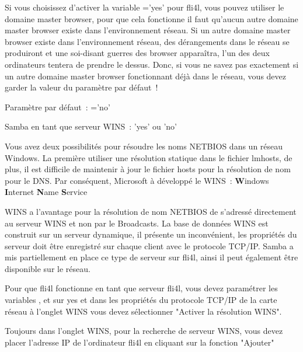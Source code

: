 \begin{description}

    Si vous choisissez d'activer la variable ='yes'
    pour fli4l, vous pouvez utiliser le domaine master browser, pour que cela
    fonctionne il faut qu'aucun autre domaine master browser existe dans
    l'environnement réseau. Si un autre domaine master browser existe dans
    l'environnement réseau, des dérangements dans le réseau se produiront et
    une soi-disant guerres des browser apparaîtra, l'un des deux ordinateurs
    tentera de prendre le dessus. Donc, si vous ne savez pas exactement si un
    autre domaine master browser fonctionnant déjà dans le réseau, vous devez
    garder la valeur du paramètre par défaut~!

    Paramètre par défaut~: ='no'



    Samba en tant que serveur WINS~: 'yes' ou 'no'

    Vous avez deux possibilités pour résoudre les noms NETBIOS dans un réseau
    Windows. La première utiliser une résolution statique dans le fichier lmhosts,
    de plus, il est difficile de maintenir à jour le fichier hosts pour la
    résolution de nom pour le DNS. Par conséquent, Microsoft à développé le WINS~:
    \textbf{W}indows \textbf{I}nternet \textbf{N}ame \textbf{S}ervice

    WINS a l'avantage pour la résolution de nom NETBIOS de s'adressé directement
    au serveur WINS et non par le Broadcasts. La base de données WINS est construit
    sur un serveur dynamique, il présente un inconvénient, les propriétés du
    serveur doit être enregistré sur chaque client avec le protocole TCP/IP.
    Samba a mis partiellement en place ce type de serveur sur fli4l, ainsi il
    peut également être disponible sur le réseau.

    Pour que fli4l fonctionne en tant que serveur fli4l, vous devez paramétrer
    les variables , 
    et  sur yes et dans les propriétés du protocole
    TCP/IP de la carte réseau à l'onglet WINS vous devez sélectionner "Activer
    la résolution WINS".

    Toujours dans l'onglet WINS, pour la recherche de serveur WINS, vous devez
    placer l'adresse IP de l'ordinateur fli4l en cliquant sur la fonction "Ajouter"


\end{description}
